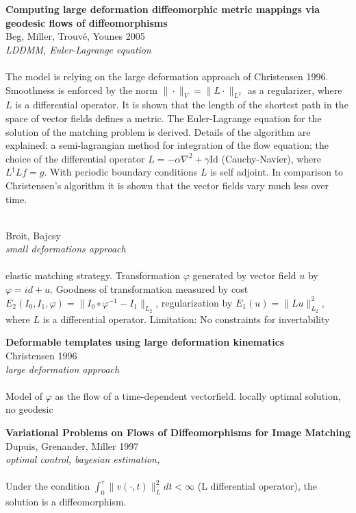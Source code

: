 \documentclass[twoside]{article}
\newcommand{\lit}[5]{%
        \textbf{\Large{#1}} \\%
        \large{#2 #3} \\%
        \textit{#4} \\%
        \vspace{0.05cm}\\%
        #5\\%
        \vspace{0.5cm}
    }
\newcommand{\Id}{\mathrm{Id}}
\begin{document}
\lit{Computing large deformation diffeomorphic metric mappings via geodesic flows of diffeomorphisms}
{Beg, Miller, Trouvé, Younes}{2005}
{LDDMM, Euler-Lagrange equation}
{The model is relying on the large deformation approach of Christensen 1996.
 Smoothness is enforced by the norm $\|\cdot\|_V = \|L\cdot\|_{L^2}$ as a regularizer, where $L$ is a differential operator. It is shown that the length of the shortest path in the space of vector fields defines a metric. The Euler-Lagrange equation for the solution of the matching problem is derived. Details of the algorithm are explained: a semi-lagrangian method for integration of the flow equation; the choice of the differential operator $L = -\alpha\nabla^2 + \gamma\Id$ (Cauchy-Navier), where $L^\dag L f = g$. With periodic boundary conditions $L$ is self adjoint.
 In comparison to Christensen's algorithm it is shown that the vector fields vary much less over time.}

\lit{}{Broit, Bajcsy}{}{small deformations approach}
{elastic matching strategy. Transformation $\varphi$ generated by vector field $u$ by $\varphi = id + u$. Goodness of transformation measured by cost $E_2(I_0, I_1, \varphi) = \|I_0\circ\varphi^{-1} - I_1\|_{L_2}$, regularization by $E_1(u) = \|Lu\|_{L_2}^2$, where $L$ is a differential operator. 
Limitation: No constraints for invertability }

\lit{Deformable templates using large deformation kinematics}{Christensen}{1996}{large deformation approach}
{Model of $\varphi$ as the flow of a time-dependent vectorfield.
locally optimal solution, no geodesic}

\lit{Variational Problems on Flows of Diffeomorphisms for Image Matching}{Dupuis, Grenander, Miller}{1997}{optimal control, bayesian estimation, }
{Under the condition $\int_{0}^{\tau} \|v(\cdot,t)\|_L^2 dt < \infty$ (L differential operator), the solution is a diffeomorphism.}
\end{document}
